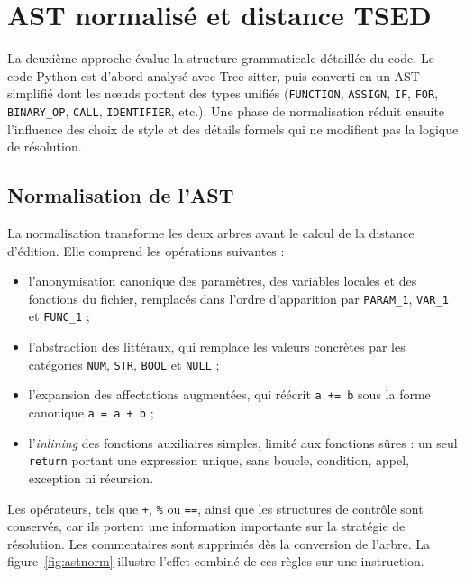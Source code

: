 {%
\section{AST normalisé et distance TSED}

La deuxième approche évalue la structure grammaticale détaillée du code. Le
code Python est d'abord analysé avec Tree-sitter, puis converti en un AST
simplifié dont les nœuds portent des types unifiés (\texttt{FUNCTION},
\texttt{ASSIGN}, \texttt{IF}, \texttt{FOR}, \texttt{BINARY\_OP}, \texttt{CALL},
\texttt{IDENTIFIER}, etc.). Une phase de normalisation réduit ensuite
l'influence des choix de style et des détails formels qui ne modifient pas la
logique de résolution.

\subsection{Normalisation de l'AST}

La normalisation transforme les deux arbres avant le calcul de la distance
d'édition. Elle comprend les opérations suivantes :
\begin{itemize}
  \item l'anonymisation canonique des paramètres, des variables locales et des
        fonctions du fichier, remplacés dans l'ordre d'apparition par
        \texttt{PARAM\_1}, \texttt{VAR\_1} et \texttt{FUNC\_1} ;
  \item l'abstraction des littéraux, qui remplace les valeurs concrètes par les
        catégories \texttt{NUM}, \texttt{STR}, \texttt{BOOL} et \texttt{NULL} ;
  \item l'expansion des affectations augmentées, qui réécrit \texttt{a += b}
        sous la forme canonique \texttt{a = a + b} ;
  \item l'\emph{inlining} des fonctions auxiliaires simples, limité aux
        fonctions sûres : un seul \texttt{return} portant une expression
        unique, sans boucle, condition, appel, exception ni récursion.
\end{itemize}

Les opérateurs, tels que \texttt{+}, \texttt{\%} ou \texttt{==}, ainsi que les
structures de contrôle sont conservés, car ils portent une information
importante sur la stratégie de résolution. Les commentaires sont supprimés dès
la conversion de l'arbre. La figure~\ref{fig:astnorm} illustre l'effet combiné
de ces règles sur une instruction.

}

